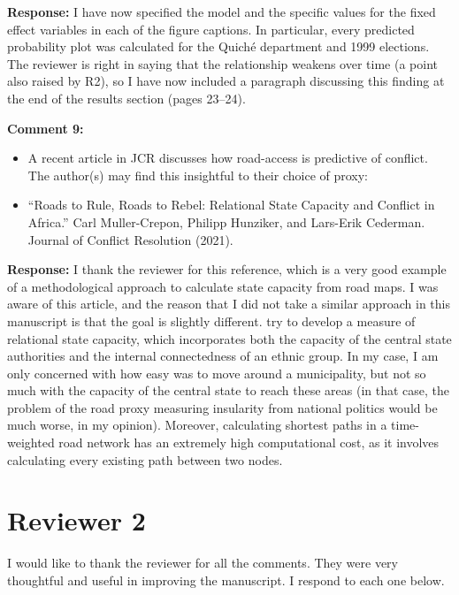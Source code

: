 \documentclass[12pt, a4paper, notitlepage]{article}
\begin{document}
\noindent\textbf{Response:} I have now specified the model and the specific values for the fixed effect variables in each of the figure captions. In particular, every predicted probability plot was calculated for the Quiché department and 1999 elections. The reviewer is right in saying that the relationship weakens over time (a point also raised by R2), so I have now included a paragraph discussing this finding at the end of the results section (pages 23--24).

\vspace{15pt}
\noindent\textbf{Comment 9:}
\begin{displayquote}
\begin{itemize}
\item A recent article in JCR discusses how road-access is predictive of conflict. The author(s) may find this insightful to their choice of proxy:
\item[] ``Roads to Rule, Roads to Rebel: Relational State Capacity and Conflict in Africa.'' Carl Muller-Crepon, Philipp Hunziker, and Lars-Erik Cederman. Journal of Conflict Resolution (2021).
\end{itemize}
\end{displayquote}

\noindent\textbf{Response:} I thank the reviewer for this reference, which is a very good example of a methodological approach to calculate state capacity from road maps. I was aware of this article, and the reason that I did not take a similar approach in this manuscript is that the goal is slightly different. \citet{Muller-Crepon:2021va} try to develop a measure of relational state capacity, which incorporates both the capacity of the central state authorities and the internal connectedness of an ethnic group. In my case, I am only concerned with how easy was to move around a municipality, but not so much with the capacity of the central state to reach these areas (in that case, the problem of the road proxy measuring insularity from national politics would be much worse, in my opinion). Moreover, calculating shortest paths in a time-weighted road network has an extremely high computational cost, as it involves calculating every existing path between two nodes.

\newpage
\section*{Reviewer 2}

I would like to thank the reviewer for all the comments. They were very thoughtful and useful in improving the manuscript. I respond to each one below.
\end{document}
